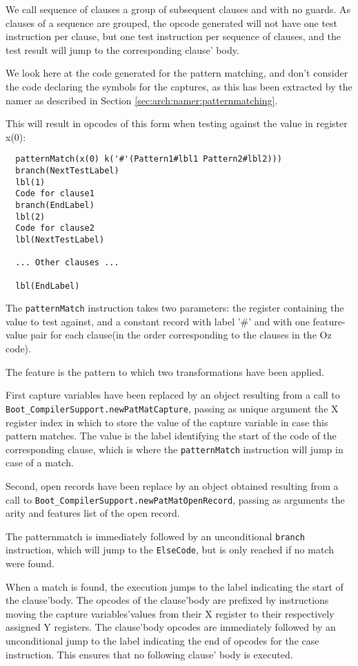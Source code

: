 \documentclass[a4paper]{memoir}
\begin{document}
We call sequence of clauses  a group of subsequent clauses and with no guards.
As clauses of a sequence are grouped, the opcode generated will not
have one test instruction per clause, but one test instruction
per sequence of clauses, and the test result will jump to the corresponding clause' body.

We look here at the code generated for the pattern matching, and don't consider
the code declaring the symbols for the captures, as this has been extracted by
the namer as described in Section \ref{sec:arch:namer:patternmatching}.

This will result in opcodes of this form when testing against the value in register x(0):
\begin{lstlisting}
  patternMatch(x(0) k('#'(Pattern1#lbl1 Pattern2#lbl2)))
  branch(NextTestLabel)
  lbl(1)
  Code for clause1
  branch(EndLabel)
  lbl(2)
  Code for clause2
  lbl(NextTestLabel)

  ... Other clauses ...

  lbl(EndLabel)
\end{lstlisting}

The \lstinline!patternMatch! instruction takes two parameters: the register containing the
value to test against, and a constant record with label '\#' and with one
feature-value pair for each clause(in the order corresponding to the clauses in the Oz code). 

The feature is the pattern to which two transformations have been applied. 

First capture variables have been replaced by an object resulting from a call to
\lstinline!Boot_CompilerSupport.newPatMatCapture!, passing as unique argument
the X register index in which to store the value of the capture variable in
case this pattern matches. The value is the label identifying the start of the
code of the corresponding clause, which is where the \lstinline!patternMatch! instruction
will jump in case of a match.

Second, open records have been replace by an object obtained resulting from a
call to \lstinline!Boot_CompilerSupport.newPatMatOpenRecord!, passing as
arguments the arity and features list of the open record.

The patternmatch is immediately followed by an unconditional \lstinline!branch! instruction,
which will jump to the \lstinline!ElseCode!, but is only reached if no match were found.

When a match is found, the execution jumps to the label indicating the start of the clause'body.
The opcodes of the clause'body are prefixed by instructions moving the capture
variables'values from their X register to their respectively assigned Y
registers.
The clause'body opcodes are immediately followed by an unconditional jump to
the label indicating the end of opcodes for the case instruction. This ensures
that no following clause' body is executed.
\end{document}
